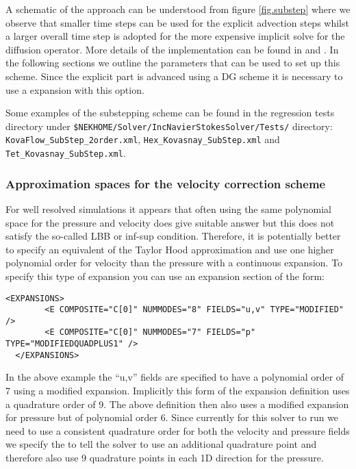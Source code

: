 A schematic of the approach can be understood from figure
\ref{fig.substep} where we observe that smaller time steps can be used
for the explicit advection steps whilst a larger overall time step is
adopted for the more expensive implicit solve for the diffusion
operator. More details of the implementation can be found in
\cite{XiShDoKa} and \cite{Sh03}. In the following sections we outline
the parameters that can be used to set up this scheme. Since the
explicit part is advanced using a DG scheme it is necessary to use a
 expansion with this option.

\begin{notebox}
Some examples of the substepping scheme can be found in the regression tests
directory under
\texttt{\${NEKHOME}/Solver/IncNavierStokesSolver/Tests/} directory:
\texttt{KovaFlow\_SubStep\_2order.xml},
\texttt{Hex\_Kovasnay\_SubStep.xml} and
\texttt{Tet\_Kovasnay\_SubStep.xml}.
\end{notebox}

\subsubsection{Approximation spaces for the velocity correction scheme}

For well resolved simulations it appears that often using the same
polynomial space for the pressure and velocity does give suitable
answer but this does not satisfy the so-called LBB or inf-sup
condition. Therefore, it is potentially better to specify an equivalent
of the Taylor Hood approximation and use one higher polynomial order
for velocity than the pressure with a continuous expansion. To specify
this type of expansion you can use an expansion section of the form:

\begin{lstlisting}[style=XMLStyle]
  <EXPANSIONS>
        <E COMPOSITE="C[0]" NUMMODES="8" FIELDS="u,v" TYPE="MODIFIED" />
        <E COMPOSITE="C[0]" NUMMODES="7" FIELDS="p"   TYPE="MODIFIEDQUADPLUS1" />
  </EXPANSIONS>
\end{lstlisting}

In the above example the ``u,v'' fields are specified to have a
polynomial order of 7 using a modified expansion. Implicitly this form
of the expansion definition uses a quadrature order of 9. The above
definition then also uses a modified expansion for pressure but of polynomial
order 6. Since currently for this solver to run we need to use a
consistent quadrature order for both the velocity and pressure fields
we specify the  to tell the solver to use an
additional quadrature point and therefore also use 9 quadrature points in
each 1D direction for the pressure.


